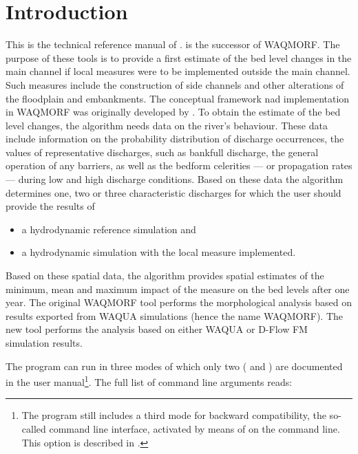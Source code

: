 \chapter{Introduction}

This is the technical reference manual of \dfastmi.
\dfastmi is the successor of WAQMORF.
The purpose of these tools is to provide a first estimate of the bed level changes in the main channel if local measures were to be implemented outside the main channel.
Such measures include the construction of side channels and other alterations of the floodplain and embankments.
The conceptual framework nad implementation in WAQMORF was originally developed by \citep{Sieben2008}.
To obtain the estimate of the bed level changes, the algorithm needs data on the river's behaviour.
These data include information on the probability distribution of discharge occurrences, the values of representative discharges, such as bankfull discharge, the general operation of any barriers, as well as the bedform celerities --- or propagation rates --- during low and high discharge conditions.
Based on these data the algorithm determines one, two or three characteristic discharges for which the user should provide the results of

\begin{itemize}
\item a hydrodynamic reference simulation and
\item a hydrodynamic simulation with the local measure implemented.
\end{itemize}

Based on these spatial data, the algorithm provides spatial estimates of the minimum, mean and maximum impact of the measure on the bed levels after one year.
The original WAQMORF tool performs the morphological analysis based on results exported from WAQUA simulations (hence the name WAQMORF).
The new \dfastmi tool performs the analysis based on either WAQUA or D-Flow FM simulation results.

The program can run in three modes of which only two ( and ) are documented in the user manual\footnote{\label{fn:backward1}The program still includes a third mode for backward compatibility, the so-called command line interface, activated by means of  on the command line.
This option is described in .}.
The full list of command line arguments reads:

